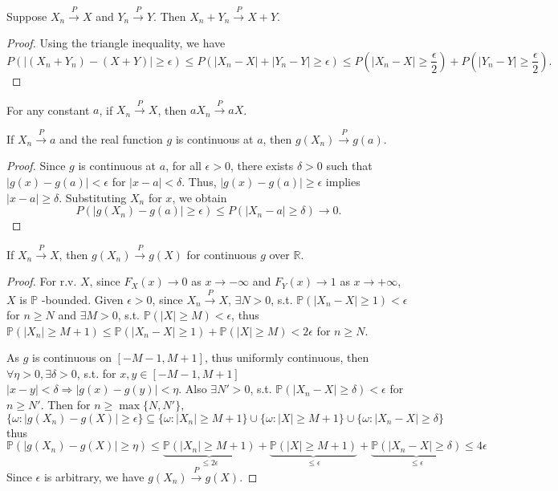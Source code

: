 \begin{theorem}
Suppose $X_n \overset{P}{\to} X$ and $Y_n \overset{P}{\to} Y$. Then $X_n + Y_n \overset{P}{\to} X + Y$.
\end{theorem}
\begin{proof}
Using the triangle inequality, we have
\[
P(|(X_n + Y_n) - (X + Y)| \geq \epsilon) \leq P(|X_n - X| + |Y_n - Y| \geq \epsilon) \leq P\left(|X_n - X| \geq \frac{\epsilon}{2}\right) + P\left(|Y_n - Y| \geq \frac{\epsilon}{2}\right).
\]
\end{proof}

\begin{theorem}
For any constant $a$, if $X_n \overset{P}{\to} X$, then $aX_n \overset{P}{\to} aX$.
\end{theorem}
\begin{theorem}
If $X_n \overset{P}{\to} a$ and the real function $g$ is continuous at $a$, then $g(X_n) \overset{P}{\to} g(a)$.
\end{theorem}
\begin{proof}
Since $g$ is continuous at $a$, for all $\epsilon > 0$, there exists $\delta > 0$ such that $|g(x) - g(a)| < \epsilon$ for $|x - a| < \delta$. Thus, $|g(x) - g(a)| \geq \epsilon$ implies $|x - a| \geq \delta$. Substituting $X_n$ for $x$, we obtain
\[
P(|g(X_n) - g(a)| \geq \epsilon) \leq P(|X_n - a| \geq \delta) \to 0.
\]
\end{proof}

\begin{exercise}
If $X_n\overset{ P }{ \to }X$, then $g(X_n)\overset{ P }{ \to }g(X)$ for continuous $g$ over $\mathbb{R}$.
\end{exercise}
\begin{proof}
For r.v. $X$, since $F_{X}(x)\to0$ as $x\to-\infty$ and $F_{Y}(x)\to1$ as $x\to+\infty$, $X$ is $\mathbb{P}$ -bounded. Given $\epsilon>0$, since $X_n\overset{ P }{ \to }X$, $\exists N>0$, s.t. $\mathbb{P}(\lvert X_n-X \rvert\geq1)<\epsilon$ for $n\geq N$ and $\exists M>0$, s.t. $\mathbb{P}(\lvert X \rvert\geq M)<\epsilon$, thus $\mathbb{P}(\lvert X_n \rvert\geq M+1)\leq \mathbb{P}(\lvert X_n-X \rvert\geq1)+\mathbb{P}(\lvert X \rvert\geq M)<2\epsilon$ for $n\geq N$.

As $g$ is continuous on $[-M-1,M+1]$, thus uniformly continuous, then  $\forall \eta>0,\exists\delta>0$, s.t. for $x, y\in[-M-1,M+1]$ $\lvert x-y \rvert<\delta\Rightarrow \lvert g(x)-g(y) \rvert<\eta$. Also $\exists N'>0$, s.t. $\mathbb{P}(\lvert X_n-X \rvert\geq\delta)<\epsilon$ for $n\geq N'$. Then for $n\geq \max\{ N,N' \}$,
\[
\{ \omega:\lvert g(X_n)-g(X) \rvert \geq \epsilon \}\subseteq \{ \omega:\lvert X_n \rvert \geq M+1 \}\cup \{ \omega:\lvert X \rvert \geq M+1 \}\cup \{ \omega:\lvert X_n-X \rvert \geq \delta \}
\]
thus
\[
\mathbb{P}(\lvert g(X_n)-g(X) \rvert \geq \eta)\leq \underbrace{ \mathbb{P}(\lvert X_n \rvert \geq M+1) }_{ \leq 2\epsilon }+\underbrace{ \mathbb{P}(\lvert X \rvert \geq M+1) }_{ \leq \epsilon }+\underbrace{ \mathbb{P}(\lvert X_n-X \rvert \geq \delta) }_{ \leq \epsilon }\leq 4\epsilon
\]
Since $\epsilon$ is arbitrary, we have $g(X_n)\overset{ P }{ \to }g(X)$.
\end{proof}

